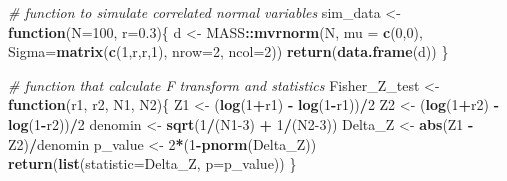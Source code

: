 \documentclass[
]{book}
\newenvironment{Shaded}{\begin{snugshade}}{\end{snugshade}}
\newcommand{\AttributeTok}[1]{\textcolor[rgb]{0.13,0.29,0.53}{#1}}
\newcommand{\CommentTok}[1]{\textcolor[rgb]{0.56,0.35,0.01}{\textit{#1}}}
\newcommand{\ControlFlowTok}[1]{\textcolor[rgb]{0.13,0.29,0.53}{\textbf{#1}}}
\newcommand{\DecValTok}[1]{\textcolor[rgb]{0.00,0.00,0.81}{#1}}
\newcommand{\FloatTok}[1]{\textcolor[rgb]{0.00,0.00,0.81}{#1}}
\newcommand{\FunctionTok}[1]{\textcolor[rgb]{0.13,0.29,0.53}{\textbf{#1}}}
\newcommand{\NormalTok}[1]{#1}
\newcommand{\OtherTok}[1]{\textcolor[rgb]{0.56,0.35,0.01}{#1}}
\newcommand{\SpecialCharTok}[1]{\textcolor[rgb]{0.81,0.36,0.00}{\textbf{#1}}}
\begin{document}
\begin{Shaded}
\begin{Highlighting}[]
\CommentTok{\# function to simulate correlated normal variables}
\NormalTok{sim\_data }\OtherTok{\textless{}{-}} \ControlFlowTok{function}\NormalTok{(}\AttributeTok{N=}\DecValTok{100}\NormalTok{, }\AttributeTok{r=}\FloatTok{0.3}\NormalTok{)\{}
\NormalTok{  d }\OtherTok{\textless{}{-}}\NormalTok{ MASS}\SpecialCharTok{::}\FunctionTok{mvrnorm}\NormalTok{(N, }
               \AttributeTok{mu =} \FunctionTok{c}\NormalTok{(}\DecValTok{0}\NormalTok{,}\DecValTok{0}\NormalTok{), }
               \AttributeTok{Sigma=}\FunctionTok{matrix}\NormalTok{(}\FunctionTok{c}\NormalTok{(}\DecValTok{1}\NormalTok{,r,r,}\DecValTok{1}\NormalTok{), }\AttributeTok{nrow=}\DecValTok{2}\NormalTok{, }\AttributeTok{ncol=}\DecValTok{2}\NormalTok{))}
  \FunctionTok{return}\NormalTok{(}\FunctionTok{data.frame}\NormalTok{(d))}
\NormalTok{\}}

\CommentTok{\# function that calculate F transform and statistics}
\NormalTok{Fisher\_Z\_test }\OtherTok{\textless{}{-}} \ControlFlowTok{function}\NormalTok{(r1, r2, N1, N2)\{}
\NormalTok{  Z1 }\OtherTok{\textless{}{-}}\NormalTok{ (}\FunctionTok{log}\NormalTok{(}\DecValTok{1}\SpecialCharTok{+}\NormalTok{r1) }\SpecialCharTok{{-}} \FunctionTok{log}\NormalTok{(}\DecValTok{1}\SpecialCharTok{{-}}\NormalTok{r1))}\SpecialCharTok{/}\DecValTok{2}
\NormalTok{  Z2 }\OtherTok{\textless{}{-}}\NormalTok{ (}\FunctionTok{log}\NormalTok{(}\DecValTok{1}\SpecialCharTok{+}\NormalTok{r2) }\SpecialCharTok{{-}} \FunctionTok{log}\NormalTok{(}\DecValTok{1}\SpecialCharTok{{-}}\NormalTok{r2))}\SpecialCharTok{/}\DecValTok{2}
\NormalTok{  denomin }\OtherTok{\textless{}{-}} \FunctionTok{sqrt}\NormalTok{(}\DecValTok{1}\SpecialCharTok{/}\NormalTok{(N1}\DecValTok{{-}3}\NormalTok{) }\SpecialCharTok{+} \DecValTok{1}\SpecialCharTok{/}\NormalTok{(N2}\DecValTok{{-}3}\NormalTok{))}
\NormalTok{  Delta\_Z }\OtherTok{\textless{}{-}} \FunctionTok{abs}\NormalTok{(Z1 }\SpecialCharTok{{-}}\NormalTok{ Z2)}\SpecialCharTok{/}\NormalTok{denomin}
\NormalTok{  p\_value }\OtherTok{\textless{}{-}} \DecValTok{2}\SpecialCharTok{*}\NormalTok{(}\DecValTok{1}\SpecialCharTok{{-}}\FunctionTok{pnorm}\NormalTok{(Delta\_Z))}
  \FunctionTok{return}\NormalTok{(}\FunctionTok{list}\NormalTok{(}\AttributeTok{statistic=}\NormalTok{Delta\_Z, }\AttributeTok{p=}\NormalTok{p\_value))}
\NormalTok{\}}


\end{Highlighting}
\end{Shaded}
\end{document}
